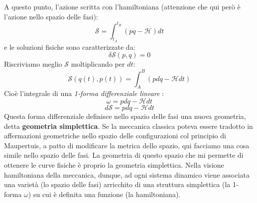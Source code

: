 \documentclass[a4paper,openany]{article}
\begin{document}
	A questo punto, l'azione scritta con l'hamiltoniana (attenzione che qui però è l'azione nello spazio delle fasi):
	$$
	\mathcal{S} = \int_{t_A}^{t_B}(p\dot{q}-\mathcal{H}) dt 
	$$
	e le soluzioni fisiche sono caratterizzate da:
	$$
	\delta \mathcal{S}(p,q) = 0
	$$
	Riscriviamo meglio $\mathcal{S}$ moltiplicando per $dt$:
	\begin{equation}\label{key}
		\mathcal{S}(q(t),p(t)) = \int_{A}^{B}(pdq-\mathcal{H}dt)
	\end{equation}
	Cioè l'integrale di una \textit{1-forma differenziale lineare} :
	$$
	\omega = pdq-\mathcal{H}dt
	$$
	$$
	d\mathcal{S} = pdq -\mathcal{H}dt
	$$
	Questa forma differenziale definisce nello spazio delle fasi una nuova geometria, detta \textbf{geometria simplettica}. Se la meccanica classica poteva essere tradotto in affermazioni geometriche nello spazio delle configurazioni col principio di Maupertuis, a patto di modificare la metrica dello spazio, qui facciamo una cosa simile nello spazio delle fasi. La geometria di questo spazio che mi permette di ottenere le curve fisiche è proprio la geometria simplettica. Nella visione hamiltoniana della meccanica, dunque, ad ogni sistema dinamico viene associata una varietà (lo spazio delle fasi) arricchito di una struttura simplettica (la 1-forma $\omega$) su cui è definita una funzione (la hamiltoniana).
\end{document}
